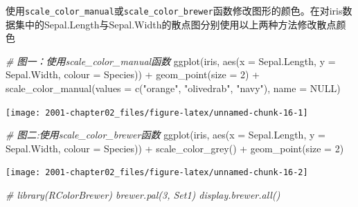 \documentclass[
]{book}
\newenvironment{Shaded}{\begin{snugshade}}{\end{snugshade}}
\newcommand{\AttributeTok}[1]{\textcolor[rgb]{0.77,0.63,0.00}{#1}}
\newcommand{\CommentTok}[1]{\textcolor[rgb]{0.56,0.35,0.01}{\textit{#1}}}
\newcommand{\ConstantTok}[1]{\textcolor[rgb]{0.00,0.00,0.00}{#1}}
\newcommand{\DecValTok}[1]{\textcolor[rgb]{0.00,0.00,0.81}{#1}}
\newcommand{\FunctionTok}[1]{\textcolor[rgb]{0.00,0.00,0.00}{#1}}
\newcommand{\NormalTok}[1]{#1}
\newcommand{\SpecialCharTok}[1]{\textcolor[rgb]{0.00,0.00,0.00}{#1}}
\newcommand{\StringTok}[1]{\textcolor[rgb]{0.31,0.60,0.02}{#1}}
\begin{document}
使用\texttt{scale\_color\_manual}或\texttt{scale\_color\_brewer}函数修改图形的颜色。在对iris数据集中的Sepal.Length与Sepal.Width的散点图分别使用以上两种方法修改散点颜色

\begin{Shaded}
\begin{Highlighting}[]
\CommentTok{\# 图一：使用scale\_color\_manual函数}
\FunctionTok{ggplot}\NormalTok{(iris, }\FunctionTok{aes}\NormalTok{(}\AttributeTok{x =}\NormalTok{ Sepal.Length, }\AttributeTok{y =}\NormalTok{ Sepal.Width, }\AttributeTok{colour =}\NormalTok{ Species)) }\SpecialCharTok{+} \FunctionTok{geom\_point}\NormalTok{(}\AttributeTok{size =} \DecValTok{2}\NormalTok{) }\SpecialCharTok{+} 
    \FunctionTok{scale\_color\_manual}\NormalTok{(}\AttributeTok{values =} \FunctionTok{c}\NormalTok{(}\StringTok{"orange"}\NormalTok{, }\StringTok{"olivedrab"}\NormalTok{, }\StringTok{"navy"}\NormalTok{), }\AttributeTok{name =} \ConstantTok{NULL}\NormalTok{)}
\end{Highlighting}
\end{Shaded}

\begin{center}\texttt{[image: 2001-chapter02\_files/figure-latex/unnamed-chunk-16-1]} \end{center}

\begin{Shaded}
\begin{Highlighting}[]
\CommentTok{\# 图二:使用scale\_color\_brewer函数}
\FunctionTok{ggplot}\NormalTok{(iris, }\FunctionTok{aes}\NormalTok{(}\AttributeTok{x =}\NormalTok{ Sepal.Length, }\AttributeTok{y =}\NormalTok{ Sepal.Width, }\AttributeTok{colour =}\NormalTok{ Species)) }\SpecialCharTok{+} \FunctionTok{scale\_color\_grey}\NormalTok{() }\SpecialCharTok{+} 
    \FunctionTok{geom\_point}\NormalTok{(}\AttributeTok{size =} \DecValTok{2}\NormalTok{)}
\end{Highlighting}
\end{Shaded}

\begin{center}\texttt{[image: 2001-chapter02\_files/figure-latex/unnamed-chunk-16-2]} \end{center}

\begin{Shaded}
\begin{Highlighting}[]
\CommentTok{\# library(RColorBrewer) brewer.pal(3, \textquotesingle{}Set1\textquotesingle{}) display.brewer.all()}
\end{Highlighting}
\end{Shaded}
\end{document}

